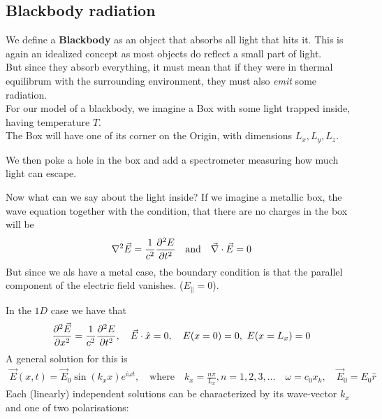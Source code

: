 \subsection{Blackbody radiation}
We define a \textbf{Blackbody} as an object that absorbs all light that hits it. This is again an idealized concept as most objects do reflect a small part of light.\\

But since they absorb everything, it must mean that if they were in thermal equilibrum with the surrounding environment, they must also \emph{emit} some radiation.\\


For our model of a blackbody, we imagine a Box with some light trapped inside, having temperature $T$.\\
The Box will have one of its corner on the Origin, with dimensions $L_x, L_y, L_z$.

We then poke a hole in the box and add a spectrometer measuring how much light can escape.

Now what can we say about the light inside? If we imagine a metallic box, the wave equation together with the condition, that there are no charges in the box will be
\begin{align*}
	\nabla^2 \vec{E} = \frac{1}{c^2} \frac{\partial^2 E}{\partial t^2} \quad \text{and} \quad \vec{\nabla} \cdot \vec{E} = 0
\end{align*}
But since we als have a metal case, the boundary condition is that the parallel component of the electric field vanishes. ($E_{\parallel} = 0$).



In the $1D$ case we have that
\begin{align*}
	\frac{\partial^2 \vec{E}}{\partial x^2} = \frac{1}{c^2} \frac{\partial^2 E}{\partial t^2}, \quad \vec{E} \cdot \hat{x} = 0, \quad E(x = 0) = 0,\ E(x = L_x) = 0
\end{align*}
A general solution for this is 
\begin{align*}
	\vec{E}(x,t) = \vec{E}_0 \sin(k_x x) e^{i \omega t}, \quad \text{where} \quad k_x = \frac{n \pi}{L_x}, n = 1, 2, 3, \ldots \quad \omega = c_0 x_k, \quad \vec{E}_0 = E_0 \hat{r}
\end{align*}
Each (linearly) independent solutions can be characterized by its wave-vector $k_x$ and one of two polarisations:


